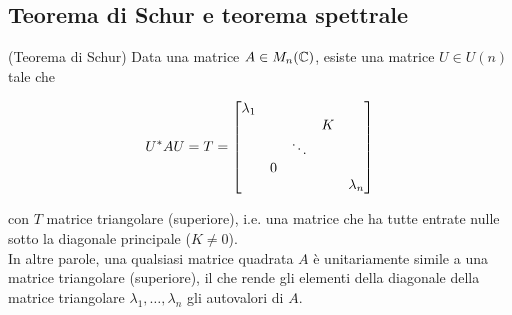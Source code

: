 \subsection{Teorema di Schur e teorema spettrale}

\begin{theorem}(Teorema di Schur)
	Data una matrice $ A \in M_{n}(\mathbb{C}) $, esiste una matrice $ U \in U(n) $ tale che
	
	\begin{equation}
		U^{*} A U = T = %
		\bmqty{ %
				\dmat{ %
						\lambda_{1},
						& & K \\ & \ddots & \\ 0 & & ,
						\lambda_{n}
						}
				}
	\end{equation}

	con $ T $ matrice triangolare (superiore), i.e. una matrice che ha tutte entrate nulle sotto la diagonale principale ($ K \neq 0 $).\\
	In altre parole, una qualsiasi matrice quadrata $ A $ è unitariamente simile a una matrice triangolare (superiore), il che rende gli elementi della diagonale della matrice triangolare $ \lambda_{1},\dots,\lambda_{n} $ gli autovalori di $ A $.
\end{theorem}

